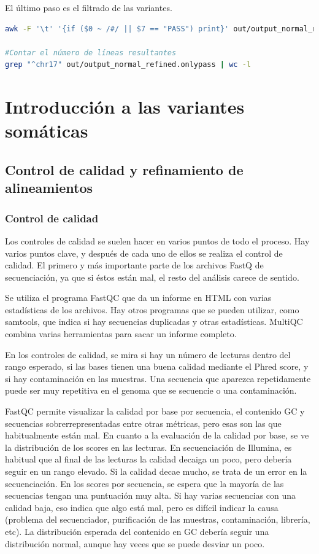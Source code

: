 El último paso es el filtrado de las variantes. 
\begin{lstlisting}[language=bash]
awk -F '\t' '{if ($0 ~ /#/ || $7 == "PASS") print}' out/output_normal_refined.recalibrated > out/output_normal_refined.onlypass

#Contar el número de líneas resultantes
grep "^chr17" out/output_normal_refined.onlypass | wc -l
\end{lstlisting}

\chapter{Introducción a las variantes somáticas}
\section{Control de calidad y refinamiento de alineamientos}
\subsection{Control de calidad}
Los controles de calidad se suelen hacer en varios puntos de todo el proceso. Hay varios puntos clave, y después de cada uno de ellos se realiza el control de calidad. El primero y más importante parte de los archivos FastQ de secuenciación, ya que si éstos están mal, el resto del análisis carece de sentido.

Se utiliza el programa FastQC que da un informe en HTML con varias estadísticas de los archivos. Hay otros programas que se pueden utilizar, como samtools, que indica si hay secuencias duplicadas y otras estadísticas. MultiQC combina varias herramientas para sacar un informe completo.

En los controles de calidad, se mira si hay un número de lecturas dentro del rango esperado, si las bases tienen una buena calidad mediante el Phred score, y si hay contaminación en las muestras. Una secuencia que aparezca repetidamente puede ser muy repetitiva en el genoma que se secuencie o una contaminación.

FastQC permite visualizar la calidad por base por secuencia, el contenido GC y secuencias sobrerrepresentadas entre otras métricas, pero esas son las que habitualmente están mal. En cuanto a la evaluación de la calidad por base, se ve la distribución de los scores en las lecturas. En secuenciación de Illumina, es habitual que al final de las lecturas la calidad decaiga un poco, pero debería seguir en un rango elevado. Si la calidad decae mucho, se trata de un error en la secuenciación. En los scores por secuencia, se espera que la mayoría de las secuencias tengan una puntuación muy alta. Si hay varias secuencias con una calidad baja, eso indica que algo está mal, pero es difícil indicar la causa (problema del secuenciador, purificación de las muestras, contaminación, librería, etc). La distribución esperada del contenido en GC debería seguir una distribución normal, aunque hay veces que se puede desviar un poco.


